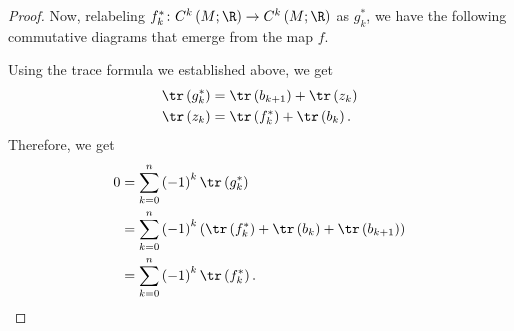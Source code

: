 \documentclass[10pt]{mypackage}
\begin{document}
\begin{proof}
  Now, relabeling $f_k^{\ast}\colon C^{k}\left( M;\R \right)\rightarrow C^{k}\left( M;\R \right)$ as $g_k^{\ast}$, we have the following commutative diagrams that emerge from the map $f$.
  \begin{center}
  \end{center}
  Using the trace formula we established above, we get
  \begin{align*}
    \tr\left( g_k^{\ast} \right) &= \tr\left( b_{k+1} \right) + \tr\left( z_k \right)\\
    \tr\left( z_k \right) &= \tr\left( f_k^{\ast} \right) + \tr\left( b_k \right).
  \end{align*}
  Therefore, we get
  \begin{align*}
    0 &= \sum_{k=0}^{n} \left( -1 \right)^{k} \tr\left( g_k^{\ast} \right)\\
      &= \sum_{k=0}^{n} \left( -1 \right)^{k} \left( \tr\left( f_k^{\ast} \right) + \tr\left( b_k \right) + \tr\left( b_{k+1} \right) \right)\\
      &= \sum_{k=0}^{n} \left( -1 \right)^{k} \tr\left( f_k^{\ast} \right).
  \end{align*}
\end{proof}
\end{document}
